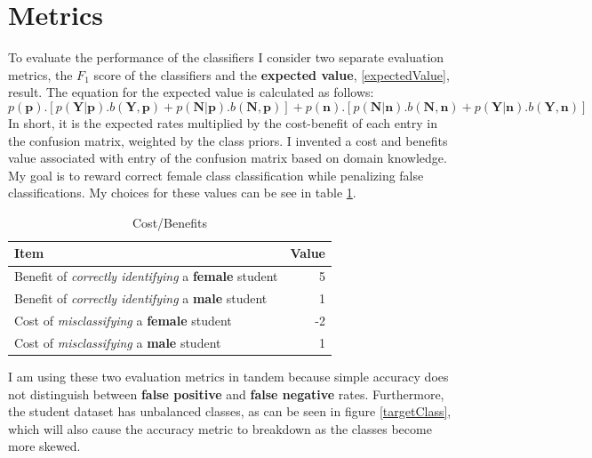 \section*{Metrics}

To evaluate the performance of the classifiers I consider two separate evaluation metrics, the $F_1$ score of the classifiers and the \textbf{expected value}, \ref{expectedValue}, result. The equation for the expected value is calculated as follows:
$$ p(\mathbf{p}).[p(\mathbf{Y}|\mathbf{p}). b(\mathbf{Y},\mathbf{p}) + p(\mathbf{N}|\mathbf{p}). b(\mathbf{N},\mathbf{p})] + p(\mathbf{n}).[p(\mathbf{N}|\mathbf{n}). b(\mathbf{N},\mathbf{n}) + 
p(\mathbf{Y}|\mathbf{n}). b(\mathbf{Y},\mathbf{n})]$$
In short, it is the expected rates multiplied by the cost-benefit of each entry in the confusion matrix, weighted by the class priors. I invented a cost and benefits value associated with entry of the confusion matrix based on domain knowledge. My goal is to reward correct female class classification while penalizing false classifications. My choices for these values can be see in table \ref{tableCostBenefit}. 

\setlength{\extrarowheight}{1.5pt}
\begin{table}[!htbp]
\caption{Cost/Benefits} %
\centering %
\begin{tabular}{|l|r|} %
\hline %

\hline
Item & Value\\[0.5ex]
\hline %

Benefit of \textit{correctly identifying} a \textbf{female} student  & 5  \\
Benefit of \textit{correctly identifying} a \textbf{male} student   & 1  \\
Cost of \textit{misclassifying} a \textbf{female} student  & -2  \\
Cost of \textit{misclassifying} a \textbf{male} student  & 1  \\

\hline%
\end{tabular}
\label{tableCostBenefit}{}
\end{table}

I am using these two evaluation metrics in tandem because simple accuracy does not distinguish between \textbf{false positive} and \textbf{false negative} rates. Furthermore, the student dataset has unbalanced classes, as can be seen in figure \ref{targetClass}, which will also cause the accuracy metric to breakdown as the classes become more skewed.

